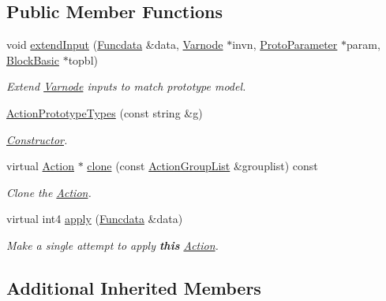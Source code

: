 \subsection*{Public Member Functions}
\begin{DoxyCompactItemize}
\item 
void \mbox{\hyperlink{class_action_prototype_types_ad501f68fdd5e2adec6bbb3d2f30fa462}{extend\+Input}} (\mbox{\hyperlink{class_funcdata}{Funcdata}} \&data, \mbox{\hyperlink{class_varnode}{Varnode}} $\ast$invn, \mbox{\hyperlink{class_proto_parameter}{Proto\+Parameter}} $\ast$param, \mbox{\hyperlink{class_block_basic}{Block\+Basic}} $\ast$topbl)
\begin{DoxyCompactList}\small\item\em Extend \mbox{\hyperlink{class_varnode}{Varnode}} inputs to match prototype model. \end{DoxyCompactList}\item 
\mbox{\hyperlink{class_action_prototype_types_af8156a426556dffd3f1bcdbd768bd318}{Action\+Prototype\+Types}} (const string \&g)
\begin{DoxyCompactList}\small\item\em \mbox{\hyperlink{class_constructor}{Constructor}}. \end{DoxyCompactList}\item 
virtual \mbox{\hyperlink{class_action}{Action}} $\ast$ \mbox{\hyperlink{class_action_prototype_types_aab34b0de3c657db76bef16ab5e2ac0dc}{clone}} (const \mbox{\hyperlink{class_action_group_list}{Action\+Group\+List}} \&grouplist) const
\begin{DoxyCompactList}\small\item\em Clone the \mbox{\hyperlink{class_action}{Action}}. \end{DoxyCompactList}\item 
virtual int4 \mbox{\hyperlink{class_action_prototype_types_a4c4654505369c0d674f2260c313c76b3}{apply}} (\mbox{\hyperlink{class_funcdata}{Funcdata}} \&data)
\begin{DoxyCompactList}\small\item\em Make a single attempt to apply {\bfseries{this}} \mbox{\hyperlink{class_action}{Action}}. \end{DoxyCompactList}\end{DoxyCompactItemize}
\subsection*{Additional Inherited Members}


